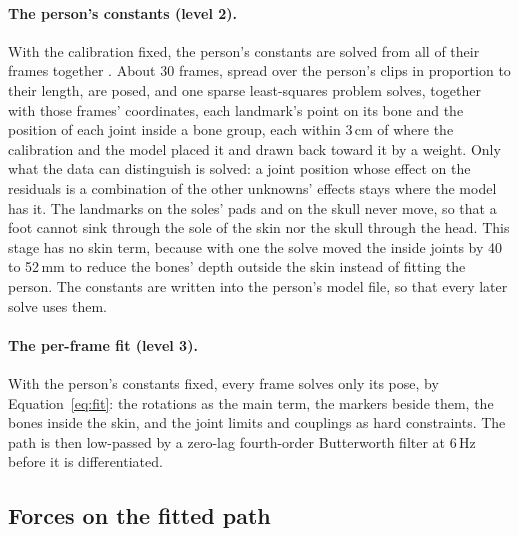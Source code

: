 \documentclass[11pt]{article}
\begin{document}
\paragraph{The person's constants (level 2).} With the calibration fixed, the person's constants are solved from all of
their frames together \cite{cotton2026b3d}. About 30 frames, spread over the person's clips in proportion to their
length, are posed, and one sparse least-squares problem solves, together with those frames' coordinates, each
landmark's point on its bone and the position of each joint inside a bone group, each within 3\,cm of where the
calibration and the model placed it and drawn back toward it by a weight. Only what the data can distinguish is
solved: a joint position whose effect on the residuals is a combination of the other unknowns' effects stays where
the model has it. The landmarks on the soles' pads and on the skull never move, so that a foot cannot sink through the
sole of the skin nor the skull through the head. This stage has no skin term, because with one the solve moved the
inside joints by 40 to 52\,mm to reduce the bones' depth outside the skin instead of fitting the person. The constants
are written into the person's model file, so that every later solve uses them.

\paragraph{The per-frame fit (level 3).} With the person's constants fixed, every frame solves only its pose, by
Equation~\eqref{eq:fit}: the rotations as the main term, the markers beside them, the bones inside the skin, and the
joint limits and couplings as hard constraints. The path is then low-passed by a zero-lag fourth-order Butterworth
filter at 6\,Hz \cite{winter2009biomechanics} before it is differentiated.


\subsection{Forces on the fitted path}
\label{sec:forces}
\end{document}
